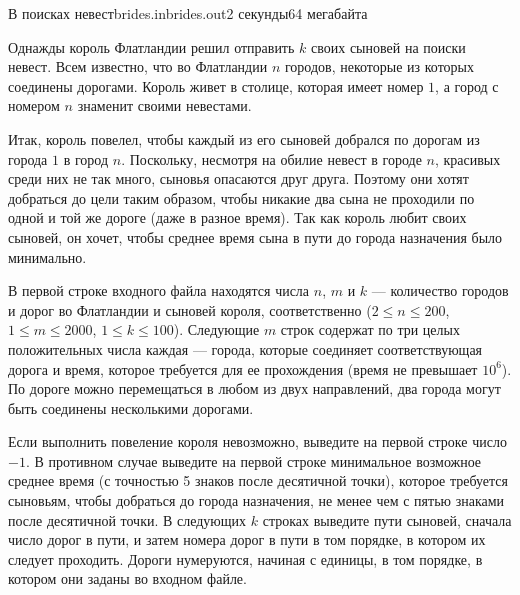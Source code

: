 \begin{problem}{В поисках невест}{brides.in}{brides.out}{2 секунды}{64 мегабайта}

Однажды король Флатландии решил отправить $k$ своих сыновей на поиски невест.
Всем известно, что во Флатландии $n$ городов, некоторые из которых соединены 
дорогами. Король живет в столице, которая имеет номер $1$, а город с номером 
$n$ знаменит своими невестами.

Итак, король повелел, чтобы каждый из его сыновей добрался по дорогам из города
$1$ в город $n$. Поскольку, несмотря на обилие невест в городе $n$, красивых среди них
не так много, сыновья опасаются друг друга. Поэтому они хотят добраться до цели
таким образом, чтобы никакие два сына не проходили по одной и той же дороге (даже
в разное время). Так как король любит своих сыновей, он хочет, чтобы среднее время
сына в пути до города назначения было минимально.

\InputFile

В первой строке входного файла находятся числа $n$, $m$ и $k$ --- количество городов и
дорог во Флатландии и сыновей короля, соответственно ($2 \le n \le 200$, $1 \le m \le 2000$,
$1 \le k \le 100$). Следующие $m$ строк содержат по три целых положительных числа каждая 
--- города, которые соединяет соответствующая дорога и время, которое требуется
для ее прохождения (время не превышает $10^6$). По дороге можно перемещаться в любом 
из двух направлений, два города могут быть соединены несколькими дорогами.


\OutputFile

Если выполнить повеление короля невозможно, выведите на первой строке число
$-1$. В противном случае выведите на первой строке минимальное возможное среднее
время (с точностью 5 знаков после десятичной точки), которое требуется сыновьям,
чтобы добраться до города назначения, не менее чем с пятью знаками после 
десятичной точки. В следующих $k$ строках выведите пути сыновей, сначала число дорог в
пути, и затем номера дорог в пути в том порядке, в котором их следует проходить.
Дороги нумеруются, начиная с единицы, в том порядке, в котором они заданы во
входном файле.

\Example

\begin{example}
%
\end{example}

\end{problem}
